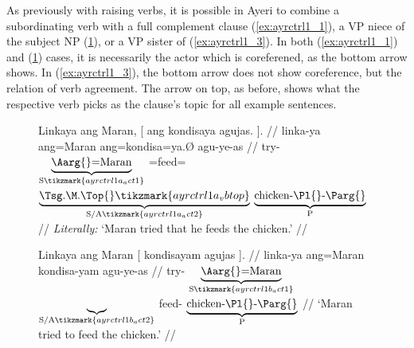 As previously with raising verbs, it is possible in Ayeri to combine a
subordinating verb with a full complement clause (\ref{ex:ayrctrl1_1}), a VP
niece of the subject NP (\ref{ex:ayrctrl1_2}), or a VP sister of  
(\ref{ex:ayrctrl1_3}). In both (\ref{ex:ayrctrl1_1}) and (\ref{ex:ayrctrl1_2})
cases, it is necessarily the actor which is coreferened, as the bottom arrow
shows. In (\ref{ex:ayrctrl1_3}), the bottom arrow does not show coreference,
but the relation of verb agreement. The arrow on top, as before, shows what the
respective verb picks as the clause's topic for all example sentences.

\begin{figure}
\pex\label{ex:ayrctrl1}
\a\label{ex:ayrctrl1_1}\begingl[aboveglcskip=1.5em, aboveglftskip=1.75em]
	\gla Linkaya {ang Maran}, \textup{[} {ang kondisaya} agujas. 
		\textup{]}. //
	\glb linka-ya ang=Maran {} ang=kondisa=ya.Ø agu-ye-as {} //
	\glc try-\TsgM{}
		$\underbrace{\text{\Aarg{}=Maran}}_{\text{S}%
			\tikzmark{ayrctrl1a_act1}
		}$
		{}
		\AgtT{}=feed=$\underbrace{\text{\smash{\TsgM{}}.\Top{}}%
			\tikzmark{ayrctrl1a_vbtop}
		}_{\text{S/A}%
			\tikzmark{ayrctrl1a_act2}
		}$
		$\underbrace{\text{chicken-\Pl{}-\Parg{}}}_{\text{P}}$
		{}
		//
	\glft \textit{Literally:} `Maran tried that he feeds the chicken.' //
\endgl
{}

\a\label{ex:ayrctrl1_2}\begingl[aboveglftskip=1.75em]
	\gla Linkaya {ang Maran} \textup{[} {} kondisayam agujas
		\textup{]}. //
	\glb linka-ya ang=Maran {} {} kondisa-yam agu-ye-as {} //
	\glc try-\TsgM{}
		$\underbrace{\text{\Aarg{}=Maran}}_{\text{S}%
			\tikzmark{ayrctrl1b_act1}
		}$
		{}
		$\underbrace{}_{\text{S/A}\tikzmark{ayrctrl1b_act2}}$
		feed-\Ptcp{}
		$\underbrace{\text{chicken-\Pl{}-\Parg{}}}_{\text{P}}$
		{}
		//
	\glft `Maran tried to feed the chicken.' //
\endgl
{}


\end{figure}
